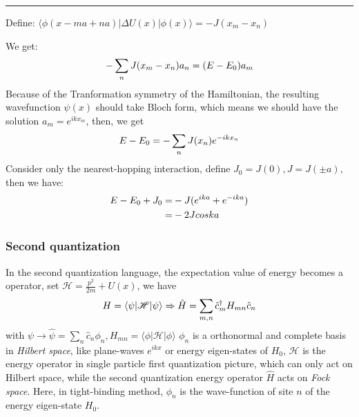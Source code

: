 \documentclass[letterpaper,10pt,english]{sphinxmanual}
\begin{document}
\bigskip\hrule{}\bigskip


Define:
\(\langle \phi(x-ma+na)|\Delta U(x) |\phi(x)\rangle=-J(x_m-x_n)\)

We get:
\begin{gather}
\begin{split}-\sum_n J(x_m-x_n) a_n=(E-E_0) a_m\end{split}\notag
\end{gather}
Because of the Tranformation symmetry of the Hamiltonian, the resulting
wavefunction \(\psi(x)\) should take Bloch form, which means we
should have the solution \(a_m=e^{ikx_m}\), then, we get
\begin{gather}
\begin{split}E-E_0=-\sum_n J(x_n)e^{-ikx_n}\end{split}\notag
\end{gather}
Consider only the nearest-hopping interaction, define
\(J_0=J(0), J=J(\pm a)\), then we have:
\begin{gather}
\begin{split}E-E_0+J_0=&-J(e^{ika}+e^{-ika}) \\
=&-2Jcoska\end{split}\notag
\end{gather}

\subsubsection{Second quantization}
\label{TI/Lecture notes/1:second-quantization}
In the second quantization language, the expectation value of energy
becomes a operator, set \(\mathscr{H}=\frac{p^2}{2m}+U(x)\), we have
\begin{gather}
\begin{split}H=\langle \psi|\mathscr{H}|\psi \rangle \Rightarrow \hat{H}=\sum_{m,n}\hat{c}_m^\dagger H_{mn}\hat{c}_n\end{split}\notag
\end{gather}
with
\(\psi \to \hat{\psi}=\sum\limits_n \hat{c}_n \phi_n, H_{mn}=\langle \phi|\mathscr{H}|\phi \rangle\)
\(\phi_n\) is a orthonormal and complete basis in \emph{Hilbert space},
like plane-waves \(e^{ikx}\) or energy eigen-states of \(H_0\),
\(\mathscr{H}\) is the energy operator in single particle first
quantization picture, which can only act on Hilbert space, while the
second quantization energy operator \(\hat{H}\) acts on \emph{Fock
space}. Here, in tight-binding method, \(\phi_n\) is the
wave-function of site \(n\) of the energy eigen-state \(H_0\).
\end{document}
